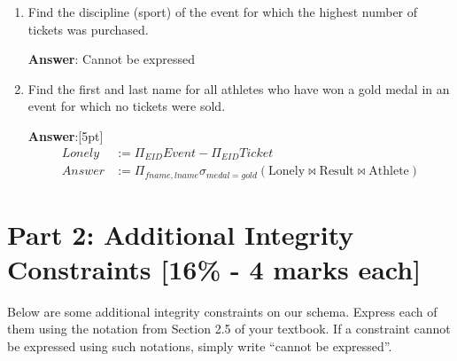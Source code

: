 \documentclass{article}
\begin{document}
\begin{enumerate}
\item   %
Find the discipline (sport) of the event for which the highest number of tickets was purchased.

{\bf Answer}: Cannot be expressed

\item   %
Find the first and last name for all athletes who have won a gold medal in an event for which no tickets were sold.

{\bf Answer}:[5pt]
\begin{equation*}
\begin{aligned}
Lonely & := \Pi_{EID} Event - \Pi_{EID} Ticket\\
Answer & := \Pi_{fname, lname} \sigma_{medal=gold} (\mathrm{Lonely} \bowtie \mathrm{Result} \bowtie \mathrm{Athlete})
\end{aligned}
\end{equation*}

\end{enumerate}



\section*{Part 2: Additional Integrity Constraints [16\% - 4 marks each]}

Below are some additional integrity constraints on our schema. Express each of them
using the notation from Section 2.5 of your textbook. If a constraint cannot be
expressed using such notations, simply write ``cannot be expressed''.
\end{document}
